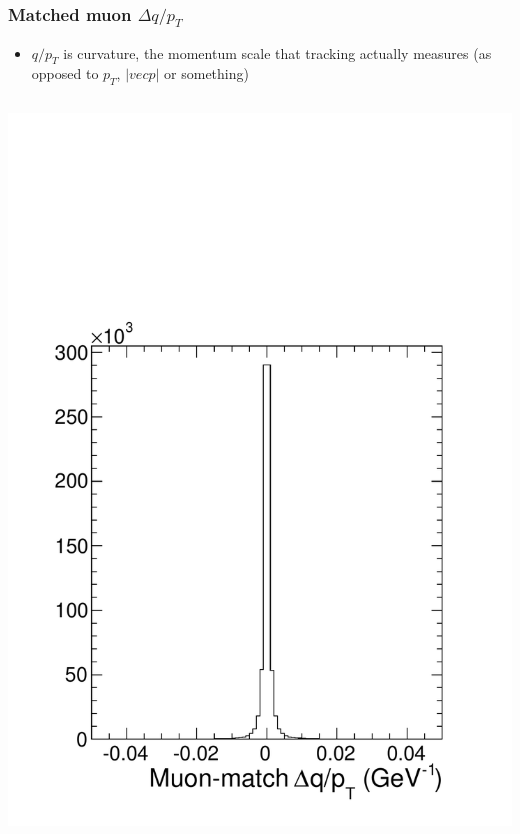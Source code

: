 \documentclass[compress]{beamer}
\begin{document}
\begin{frame}
\frametitle{Matched muon $\Delta q/p_{T}$}

\begin{itemize}
\item $q/p_{T}$ is curvature, the momentum scale that tracking
  actually measures (as opposed to $p_{T}$, $|vec{p}|$ or something)
\end{itemize}

\begin{columns}
\includegraphics[width=\linewidth]{match_dqoverpt.pdf}

\end{columns}
\end{frame}
\end{document}
